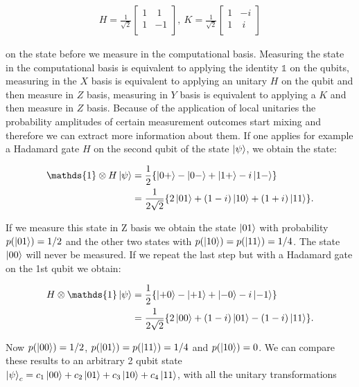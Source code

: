 \documentclass[submission, Phys]{SciPost}
\begin{document}
\begin{align}
H = \frac{1}{\sqrt{2}} 
\begin{bmatrix}
1 &~1 \\
1 &-1 \\ 
\end{bmatrix},~
K = \frac{1}{\sqrt{2}} 
\begin{bmatrix}
1 &-i \\
1 &~i \\ 
\end{bmatrix}
\end{align} 

 on the state before we measure in the computational basis. Measuring the state in the computational basis is equivalent to applying the identity $\mathds{1}$ on the qubits, measuring in the $X$ basis is equivalent to applying an unitary $H$ on the qubit and then measure in $Z$ basis, measuring in $Y$ basis is equivalent to applying a $K$ and then measure in $Z$ basis. Because of the application of local unitaries the probability amplitudes of certain measurement outcomes start mixing and therefore we can extract more information about them.  If one applies for example a Hadamard gate $H$ on the second qubit of the state $\ket{\psi}$, we obtain the state:

\begin{align}
\mathds{1} \otimes H \ket{\psi} &= \frac{1}{2} \{ \ket{0+} - \ket{0-} + \ket{1+} - i \ket{1-} \} \\
&=  \frac{1}{2 \sqrt{2}} \{ 2 \ket{01} + (1-i)\ket{10} + (1+i)\ket{11} \}. 
\end{align}

If we measure this state in Z basis we obtain the state $\ket{01}$ with probability $p(\ket{01}) = 1/2$ and the other two states with $p(\ket{10}) = p(\ket{11}) = 1/4$. The state $\ket{00}$ will never be measured. If we repeat the last step but with a Hadamard gate on the 1st qubit we obtain:

\begin{align}
H  \otimes \mathds{1} \ket{\psi} &= \frac{1}{2} \{ \ket{+0} - \ket{+1} + \ket{-0} - i \ket{-1} \} \\
&=  \frac{1}{2 \sqrt{2}} \{ 2 \ket{00} + (1-i)\ket{01} - (1-i)\ket{11} \}. 
\end{align}

Now $p(\ket{00}) = 1/2$, $p(\ket{01}) = p(\ket{11}) = 1/4$ and $p(\ket{10}) = 0$. We can compare these results to an arbitrary 2 qubit state $\ket{\psi}_c =  c_1 \ket{00} +c_2 \ket{01} + c_3 \ket{10} +c_4 \ket{11}$, with all the unitary transformations
\end{document}

